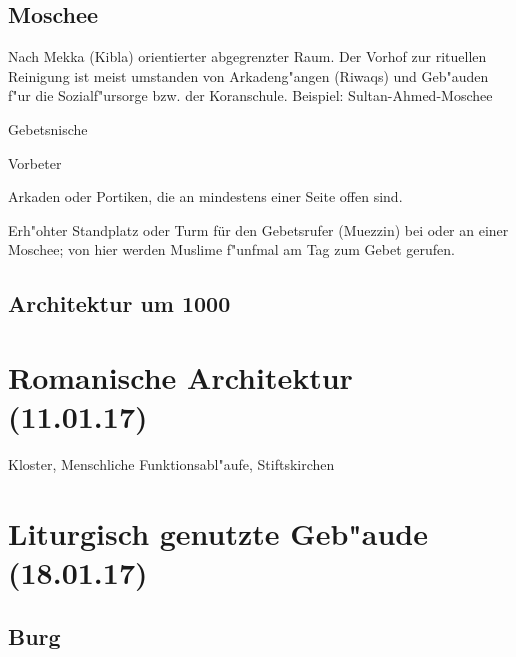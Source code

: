 \documentclass[emulatestandardclasses]{scrartcl}
\begin{document}
\subsection{Moschee}

\begin{description}[leftmargin=!,labelwidth=\widthof{\bfseries Thoraschrein}]
  \item[Allgemeines] Nach Mekka (Kibla) orientierter abgegrenzter Raum. Der Vorhof zur rituellen Reinigung ist meist umstanden von Arkadeng"angen (Riwaqs) und Geb"auden f"ur die Sozialf"ursorge bzw. der Koranschule. Beispiel: Sultan-Ahmed-Moschee
  \item[Mihrab] Gebetsnische
  \item[Imam] Vorbeter
  \item[Riwaq] Arkaden oder Portiken, die an mindestens einer Seite offen sind.
  \item[Minarett] Erh"ohter Standplatz oder Turm für den Gebetsrufer (Muezzin) bei oder an einer Moschee; von hier werden Muslime f"unfmal am Tag zum Gebet gerufen. 
\end{description}

\subsection{Architektur um 1000}


\section{Romanische Architektur\\(11.01.17)}

Kloster, Menschliche Funktionsabl"aufe, Stiftskirchen


\section{Liturgisch genutzte Geb"aude\\(18.01.17)}


\subsection{Burg}
\end{document}
